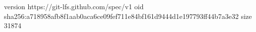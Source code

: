 version https://git-lfs.github.com/spec/v1
oid sha256:a718958afb8f1aab0aca6ce09fef711e84bf161d9444d1e197793ff44b7a3e32
size 31874
